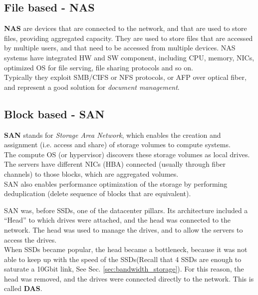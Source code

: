 
\subsection{File based - NAS}
\textbf{NAS} are devices that are connected to the network, and that are used to store files, providing aggregated capacity. They are used to store files that are accessed by multiple users, and that need to be accessed from multiple devices.
NAS systems have integrated HW and SW component, including CPU, memory, NICs, optimized OS for file serving, file sharing protocols and so on.\\
Typically they exploit SMB/CIFS or NFS protocols, or AFP over optical fiber, and represent a good solution for \textit{document management}.

\subsection{Block based - SAN}
\textbf{SAN} stands for \textit{Storage Area Network}, which enables the creation and assignment (i.e. access and share) of storage volumes to compute systems.\\
The compute OS (or hypervisor) discovers these storage volumes as local drives.
The servers have different NICs (HBA) connected (usually through
fiber channels) to those blocks, which are aggregated volumes.\\
SAN also enables performance optimization of the storage by performing
deduplication (delete sequence of blocks that are equivalent).


SAN was, before SSDs, one of the datacenter pillars.
Its architecture included a ``Head'' to which drives were attached, and the head was connected to the network. The head was used to manage the drives, and to allow the servers to access the drives.\\
When SSDs became popular, the head became a bottleneck, because it was not able to keep up with the speed of the SSDs(Recall that 4 SSDs are enough to saturate a 10Gbit link, See Sec. \ref{sec:bandwidth_storage}). For this reason, the head was removed, and the drives were connected directly to the network. This is called \textbf{DAS}.

